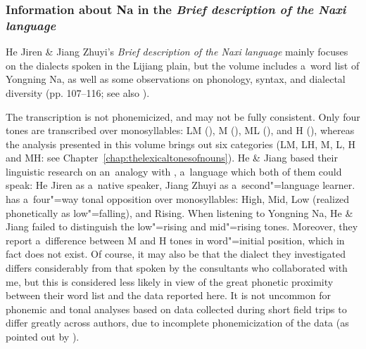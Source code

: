 \subsubsection{Information about Na in the \textit{Brief description of the Naxi language}}
\label{sec:heandjiang1985}

He Jiren \& Jiang Zhuyi’s \citeyear{heetal1985} \textit{Brief description of the Naxi language} mainly focuses on the dialects spoken in the Lijiang plain, but
the volume includes a~word list of Yongning Na, as well as some observations on phonology,
syntax, and dialectal diversity (pp. 107--116; see also \citealt{jiang1993}).

The transcription is not phonemicized, and may not be fully consistent. Only four tones are
transcribed over monosyllables: LM (), M (), ML (), and H (), whereas
the analysis presented in this volume brings out six categories (LM, LH, M, L, H and MH: see
Chapter~\ref{chap:thelexicaltonesofnouns}). He \& Jiang based their linguistic research on
an~{analogy} with , a~language which both of them could speak: He Jiren as a~native speaker, Jiang
Zhuyi as a~second"=language learner.  has a~four"=way tonal opposition over monosyllables:
High, Mid, Low (realized phonetically as low"=falling),
and Rising. When listening to Yongning Na, He \& Jiang failed to distinguish the low"=rising and mid"=rising tones. Moreover, they report a~difference between M and H tones in word"=initial position, which in fact does not
exist. Of course, it may also be that the dialect they investigated differs considerably from
that spoken by the consultants who collaborated with me, but this is considered less likely in view of the great
phonetic proximity between their word list and the data reported here. It is not
uncommon for phonemic and tonal analyses based on data collected during short field trips to differ
greatly across authors, due to incomplete phonemicization of the data (as pointed out by
\citealt[329]{matisoff2004}). 

